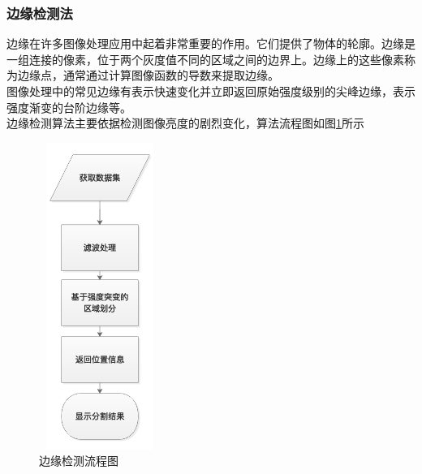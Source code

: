 \documentclass[conference]{IEEEtran}
\begin{document}
\subsubsection{边缘检测法}边缘在许多图像处理应用中起着非常重要的作用。它们提供了物体的轮廓。边缘是一组连接的像素，位于两个灰度值不同的区域之间的边界上。边缘上的这些像素称为边缘点，通常通过计算图像函数的导数来提取边缘。\\
图像处理中的常见边缘有表示快速变化并立即返回原始强度级别的尖峰边缘，表示强度渐变的台阶边缘等。\\
边缘检测算法主要依据检测图像亮度的剧烈变化，算法流程图如图\ref{img}所示
 \begin{figure}[h]
  \centering
  \includegraphics[width=4.0cm,height=10.0cm]{1.png} %
  \caption{边缘检测流程图} %
  \label{img} %
\end{figure}
\end{document}
